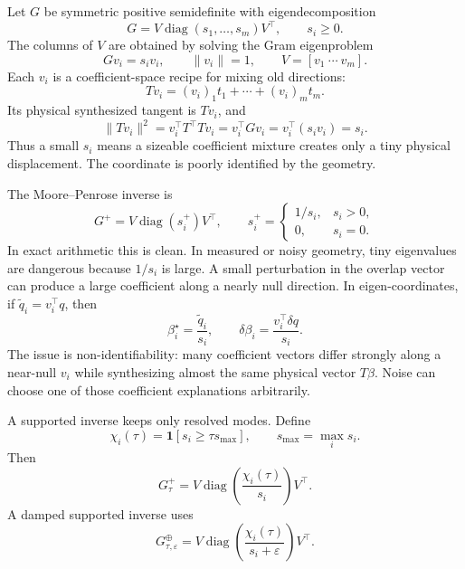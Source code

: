 \documentclass[10pt,twocolumn]{article}
\newcommand{\diag}{\operatorname{diag}}
\newcommand{\eps}{\varepsilon}
\begin{document}
Let $G$ be symmetric positive semidefinite with eigendecomposition
\begin{equation}
G=V\diag(s_1,\dots,s_m)V^\top,
\qquad s_i\ge0.
\label{eq:eigendecomp_G}
\end{equation}
The columns of \(V\) are obtained by solving the Gram eigenproblem
\begin{equation}
Gv_i=s_i v_i,
\qquad
\|v_i\|=1,
\qquad
V=[v_1\ \cdots\ v_m].
\label{eq:gram_eigenproblem}
\end{equation}
Each \(v_i\) is a coefficient-space recipe for mixing old directions:
\begin{equation}
Tv_i=(v_i)_1t_1+\cdots+(v_i)_m t_m.
\label{eq:vi_synthesizes_old_mixture}
\end{equation}
Its physical synthesized tangent is \(Tv_i\), and
\begin{equation}
\|Tv_i\|^2
=v_i^\top T^\top T v_i
=v_i^\top Gv_i
=v_i^\top(s_i v_i)
=s_i.
\label{eq:singular_value_physical_length}
\end{equation}
Thus a small \(s_i\) means a sizeable coefficient mixture creates only a tiny physical displacement. The coordinate is poorly identified by the geometry.

The Moore--Penrose inverse is
\begin{equation}
G^+=V\diag(s_i^+)V^\top,
\qquad
s_i^+=\begin{cases}
1/s_i,&s_i>0,\\
0,&s_i=0.
\end{cases}
\label{eq:pinv_eigen}
\end{equation}
In exact arithmetic this is clean. In measured or noisy geometry, tiny eigenvalues are dangerous because $1/s_i$ is large. A small perturbation in the overlap vector can produce a large coefficient along a nearly null direction.
In eigen-coordinates, if \(\tilde q_i=v_i^\top q\), then
\begin{equation}
\beta_i^\star=\frac{\tilde q_i}{s_i},
\qquad
\delta\beta_i=\frac{v_i^\top\delta q}{s_i}.
\label{eq:small_mode_noise_amplification}
\end{equation}
The issue is non-identifiability: many coefficient vectors differ strongly along a near-null \(v_i\) while synthesizing almost the same physical vector \(T\beta\). Noise can choose one of those coefficient explanations arbitrarily.

A supported inverse keeps only resolved modes. Define
\begin{equation}
\chi_i(\tau)=\mathbf 1[s_i\ge\tau s_{\max}],
\qquad s_{\max}=\max_i s_i.
\label{eq:support_indicator}
\end{equation}
Then
\begin{equation}
\boxed{
G_\tau^+
=V\diag\!\left(\frac{\chi_i(\tau)}{s_i}\right)V^\top.
}
\label{eq:supported_inverse}
\end{equation}
A damped supported inverse uses
\begin{equation}
G_{\tau,\eps}^{\oplus}
=V\diag\!\left(\frac{\chi_i(\tau)}{s_i+\eps}\right)V^\top.
\label{eq:damped_supported_inverse}
\end{equation}
\end{document}
